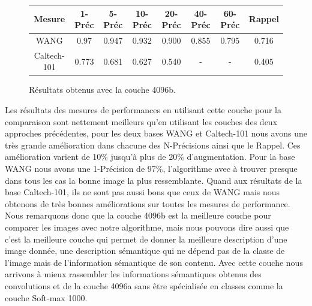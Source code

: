 \begin{figure}[H]
\begin{center}
\begin{tabular}{|c|c|c|c|c|c|c|c|}
\hline
	Mesure & 1-Préc & 5-Préc & 10-Préc & 20-Préc & 40-Préc & 60-Préc & Rappel\\
\hline
	WANG & 0.97 & 0.947 & 0.932 & 0.900 & 0.855 & 0.795 & 0.716\\
\hline
	Caltech-101 & 0.773 & 0.681 & 0.627 & 0.540 & - & - & 0.405\\
\hline
\end{tabular}
\end{center}
\caption{Résultats obtenus avec la couche 4096b.}
\end{figure}

	Les résultats des mesures de performances en utilisant cette couche pour la comparaison sont nettement meilleurs qu'en utilisant les couches des deux approches précédentes, pour les deux bases WANG et Caltech-101 nous avons une très grande amélioration dans chacune des N-Précisions ainsi que le Rappel. Ces amélioration varient de 10\% jusqu'à plus de 20\% d'augmentation.
	Pour la base WANG nous avons une 1-Précision de 97\%, l'algorithme avec à trouver presque dans tous les cas la bonne image la plus ressemblante. Quand aux résultats de la base Caltech-101, ils ne sont pas aussi bons que ceux de WANG mais nous obtenons de très bonnes améliorations sur toutes les mesures de performance. 
	Nous remarquons donc que la couche 4096b est la meilleure couche pour comparer les images avec notre algorithme, mais nous pouvons dire aussi que c'est la meilleure couche qui permet de donner la meilleure description d'une image donnée, une description sémantique qui ne dépend pas de la classe de l'image mais de l'information sémantique de son contenu. Avec cette couche nous arrivons à mieux rassembler les informations sémantiques obtenus des convolutions et de la couche 4096a sans être spécialisée en classes comme la couche Soft-max 1000.



